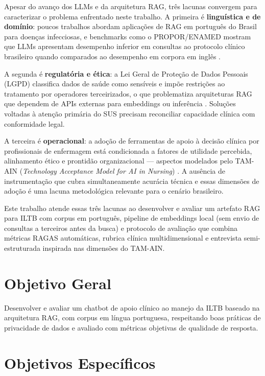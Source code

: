 \documentclass[
  12pt,
  oneside,
  a4paper,
  english,
  brazil
]{abntex2}
\begin{document}
Apesar do avanço dos LLMs e da arquitetura RAG, três lacunas convergem para
caracterizar o problema enfrentado neste trabalho. A primeira é \textbf{linguística e
de domínio}: poucos trabalhos abordam aplicações de RAG em português do Brasil para
doenças infecciosas, e benchmarks como o PROPOR/ENAMED mostram que LLMs apresentam
desempenho inferior em consultas ao protocolo clínico brasileiro quando comparados
ao desempenho em corpora em inglês \cite{teachingLLMsBrazil2026,
adaptingLLMsPortuguese2024, llmsMedicalExam2026}.

A segunda é \textbf{regulatória e ética}: a Lei Geral de Proteção de Dados Pessoais
(LGPD) classifica dados de saúde como sensíveis e impõe restrições ao tratamento por
operadores terceirizados, o que problematiza arquiteturas RAG que dependem de APIs
externas para embeddings ou inferência \cite{lgpdSaude2023, lgpdEnfermagem2022,
sokPrivacyLLM2026, privacyRAGHealthcare2025}. Soluções voltadas à atenção primária do
SUS precisam reconciliar capacidade clínica com conformidade legal.

A terceira é \textbf{operacional}: a adoção de ferramentas de apoio à decisão
clínica por profissionais de enfermagem está condicionada a fatores de utilidade
percebida, alinhamento ético e prontidão organizacional --- aspectos modelados pelo
TAM-AIN (\textit{Technology Acceptance Model for AI in Nursing})
\cite{nursingTAM2024}. A ausência de instrumentação que cubra simultaneamente
acurácia técnica e essas dimensões de adoção é uma lacuna metodológica relevante
para o cenário brasileiro.

Este trabalho atende essas três lacunas ao desenvolver e avaliar um artefato RAG
para ILTB com corpus em português, pipeline de embeddings local (sem envio de
consultas a terceiros antes da busca) e protocolo de avaliação que combina métricas
RAGAS automáticas, rubrica clínica multidimensional e entrevista
semi-estruturada inspirada nas dimensões do TAM-AIN.

\section{Objetivo Geral}

Desenvolver e avaliar um chatbot de apoio clínico ao manejo da ILTB baseado na
arquitetura RAG, com corpus em língua portuguesa, respeitando boas práticas de
privacidade de dados e avaliado com métricas objetivas de qualidade de resposta.

\section{Objetivos Específicos}
\end{document}
